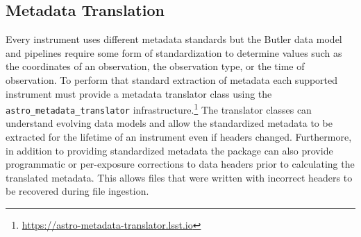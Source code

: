 \subsection{Metadata Translation}

Every instrument uses different metadata standards but the Butler data model and pipelines require some form of standardization to determine values such as the coordinates of an observation, the observation type, or the time of observation.
To perform that standard extraction of metadata each supported instrument must provide a metadata translator class using the \texttt{astro\_metadata\_translator} infrastructure.\footnote{\url{https://astro-metadata-translator.lsst.io}}
The translator classes can understand evolving data models and allow the standardized metadata to be extracted for the lifetime of an instrument even if headers changed.
Furthermore, in addition to providing standardized metadata the package can also provide programmatic or per-exposure corrections to data headers prior to calculating the translated metadata.
This allows files that were written with incorrect headers to be recovered during file ingestion.

